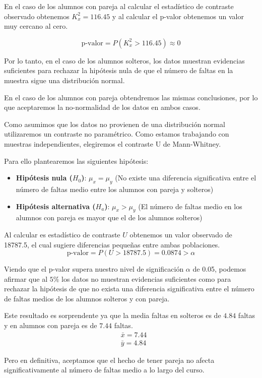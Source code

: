 \pagebreak

En el caso de los alumnos con pareja al calcular el estadístico de contraste observado obtenemos $K^2_x = 116.45$ y al calcular el p-valor obtenemos un valor muy cercano al cero.

\begin{equation*}
    \text{p-valor} = P(K^2_x > 116.45) \approx 0
\end{equation*}

Por lo tanto, en el caso de los alumnos solteros, los datos muestran evidencias suficientes para rechazar la hipótesis nula de que el número de faltas en la muestra sigue una distribución normal.

En el caso de los alumnos con pareja obtendremos las mismas conclusiones, por lo que aceptaremos la no-normalidad de los datos en ambos casos.
\pagebreak

Como asumimos que los datos no provienen de una distribución normal utilizaremos un contraste no paramétrico. Como estamos trabajando con muestras independientes, elegiremos el contraste U de Mann-Whitney.

Para ello plantearemos las siguientes hipótesis:

\begin{itemize}
    \item \textbf{Hipótesis nula ($H_0$)}: $\mu_x = \mu_y$ (No existe una diferencia significativa entre el número de faltas medio entre los alumnos con pareja y solteros)
    \item \textbf{Hipótesis alternativa ($H_a$)}: $\mu_x > \mu_y$ (El número de faltas medio en los alumnos con pareja es mayor que el de los alumnos solteros)
\end{itemize}

Al calcular es estadístico de contraste $U$ obtenemos un valor observado de 18787.5, el cual sugiere diferencias pequeñas entre ambas poblaciones.
\begin{equation*}
    \text{p-valor} = P(U > 18787.5) = 0.0874 > \alpha 
\end{equation*}

Viendo que el p-valor supera nuestro nivel de significación $\alpha$ de 0.05, podemos afirmar que al $5\%$ los datos no muestran evidencias suficientes como para rechazar la hipótesis de que no exista una diferencia significativa entre el número de faltas medios de los alumnos solteros y con pareja.

Este resultado es sorprendente ya que la media faltas en solteros es de $4.84$ faltas y en alumnos con pareja es de $7.44$ faltas. 
\begin{equation*}
    \begin{split}
        & \bar{x} = 7.44\\
        & \bar{y} = 4.84
    \end{split}
\end{equation*}

Pero en definitiva, aceptamos que el hecho de tener pareja no afecta significativamente al número de faltas medio a lo largo del curso.
